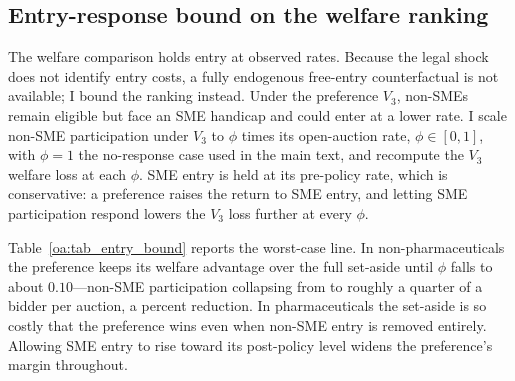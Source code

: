 \documentclass[12pt]{article}
\begin{document}
\subsection{Entry-response bound on the welfare ranking}\label{oa:entry_bound}

The welfare comparison holds entry at observed rates. Because the legal shock
does not identify entry costs, a fully endogenous free-entry counterfactual is
not available; I bound the ranking instead. Under the preference $V_3$,
non-SMEs remain eligible but face an SME handicap and could enter at a lower
rate. I scale non-SME participation under $V_3$ to $\phi$ times its
open-auction rate, $\phi\in[0,1]$, with $\phi=1$ the no-response case used in
the main text, and recompute the $V_3$ welfare loss at each $\phi$. SME entry
is held at its pre-policy rate, which is conservative: a preference raises the
return to SME entry, and letting SME participation respond lowers the $V_3$
loss further at every $\phi$.

Table~\ref{oa:tab_entry_bound} reports the worst-case line. In
non-pharmaceuticals the preference keeps its welfare advantage over the full
set-aside until $\phi$ falls to about $0.10$---non-SME participation collapsing
from \bneNnsPreNp{} to roughly a quarter of a bidder per auction, a
\entryFlipDiscNp{} percent reduction. In pharmaceuticals the set-aside is so
costly that the preference wins even when non-SME entry is removed entirely.
Allowing SME entry to rise toward its post-policy level widens the
preference's margin throughout.
\end{document}
